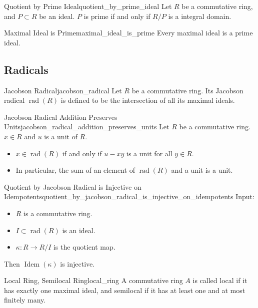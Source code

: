 \documentclass{article}
\begin{document}
\begin{corollary}{Quotient by Prime Ideal}{quotient_by_prime_ideal}
    Let $R$ be a commutative ring, and $P\subset R$ be an ideal.
    $P$ is prime if and only if $R/P$ is a integral domain.
\end{corollary}

\begin{corollary}{Maximal Ideal is Prime}{maximal_ideal_is_prime}
    Every maximal ideal is a prime ideal.
\end{corollary}

\subsection{Radicals}

\begin{definition}{Jacobson Radical}{jacobson_radical}
    Let $R$ be a commutative ring.
    Its Jacobson radical $\operatorname{rad}(R)$ is defined to be the intersection of all its maximal ideals.
\end{definition}

\begin{proposition}{Jacobson Radical Addition Preserves Units}{jacobson_radical_addition_preserves_units}
    Let $R$ be a commutative ring.
    $x\in R$ and $u$ is a unit of $R$.
    \begin{itemize}
        \item $x\in\operatorname{rad}(R)$ if and only if $u - xy$ is a unit for all $y\in R$.
        \item In particular, the sum of an element of $\operatorname{rad}(R)$ and a unit is a unit.
    \end{itemize}
\end{proposition}

\begin{proposition}{Quotient by Jacobson Radical is Injective on Idempotents}{quotient_by_jacobson_radical_is_injective_on_idempotents}
    Input:
    \begin{itemize}
        \item $R$ is a commutative ring.
        \item $I\subset \operatorname{rad}(R)$ is an ideal.
        \item $\kappa: R\rightarrow R/I$ is the quotient map.
    \end{itemize}
    Then $\operatorname{Idem}(\kappa)$ is injective.
\end{proposition}

\begin{definition}{Local Ring, Semilocal Ring}{local_ring}
    A commutative ring $A$ is called local if it has exactly one maximal ideal, and semilocal if it has at least one and at most finitely many.
\end{definition}
\end{document}
